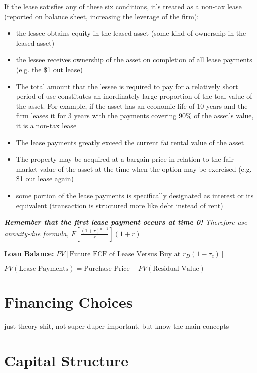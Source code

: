 \documentclass{report}
\begin{document}
\vspace*{1\baselineskip}
If the lease satisfies any of these six conditions, it's treated as a non-tax lease (reported on balance sheet, increasing the leverage of the firm):
\begin{itemize}
\item the lessee obtains equity in the leased asset (some kind of ownership in the leased asset)
\item the lessee receives ownership of the asset on completion of all lease payments (e.g. the \$1 out lease)
\item The total amount that the lessee is required to pay for a relatively short period of use constitutes an inordinately large proportion of the toal value of the asset. For example, if the asset has an economic life of 10 years and the firm leases it for 3 years with the payments covering 90\% of the asset's value, it is a non-tax lease
\item The lease payments greatly exceed the current fai rental value of the asset
\item The property may be acquired at a bargain price in relation to the fair market value of the asset at the time when the option may be exercised (e.g. \$1 out lease again)
\item some portion of the lease payments is specifically designated as interest or its equivalent (transaction is structured more like debt instead of rent)
\end{itemize}
\textit{\textbf{Remember that the first lease payment occurs at time 0!} Therefore use \emph{annuity-due formula}, $F[\frac{(1+r)^{n-1}}{r}](1+r)$}
\vspace*{1\baselineskip}

\textbf{Loan Balance:} $PV[\mbox{Future FCF of Lease Versus Buy at } r_D(1-\tau_c)]$

\vspace*{1\baselineskip}
$PV(\mbox{Lease Payments}) = \mbox{Purchase Price} - PV(\mbox{Residual Value})$

\section{Financing Choices}
\label{sec:financ-choic}

just theory shit, not super duper important, but know the main concepts

\section{Capital Structure }
\label{sec:capital-structure-1}
\end{document}
